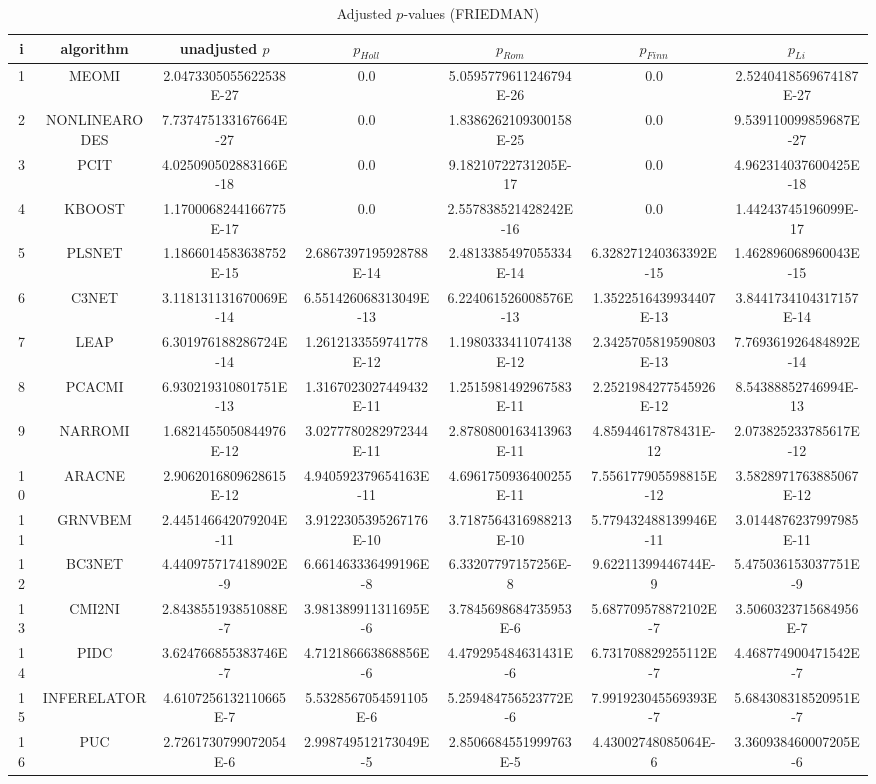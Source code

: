 \documentclass[a4paper,10pt]{article}
\begin{document}
\begin{landscape}
\begin{table}[!htp]
\centering\scriptsize
\caption{Adjusted $p$-values (FRIEDMAN)}
\begin{tabular}{ccccccc}
i&algorithm&unadjusted $p$&$p_{Holl}$&$p_{Rom}$&$p_{Finn}$&$p_{Li}$\\
\hline
1&MEOMI&2.0473305055622538E-27&0.0&5.0595779611246794E-26&0.0&2.5240418569674187E-27\\
2&NONLINEARODES&7.737475133167664E-27&0.0&1.8386262109300158E-25&0.0&9.539110099859687E-27\\
3&PCIT&4.025090502883166E-18&0.0&9.18210722731205E-17&0.0&4.962314037600425E-18\\
4&KBOOST&1.1700068244166775E-17&0.0&2.557838521428242E-16&0.0&1.44243745196099E-17\\
5&PLSNET&1.1866014583638752E-15&2.6867397195928788E-14&2.4813385497055334E-14&6.328271240363392E-15&1.462896068960043E-15\\
6&C3NET&3.118131131670069E-14&6.551426068313049E-13&6.224061526008576E-13&1.3522516439934407E-13&3.8441734104317157E-14\\
7&LEAP&6.301976188286724E-14&1.2612133559741778E-12&1.1980333411074138E-12&2.3425705819590803E-13&7.769361926484892E-14\\
8&PCACMI&6.930219310801751E-13&1.3167023027449432E-11&1.2515981492967583E-11&2.2521984277545926E-12&8.54388852746994E-13\\
9&NARROMI&1.6821455050844976E-12&3.0277780282972344E-11&2.8780800163413963E-11&4.85944617878431E-12&2.073825233785617E-12\\
10&ARACNE&2.9062016809628615E-12&4.940592379654163E-11&4.6961750936400255E-11&7.556177905598815E-12&3.5828971763885067E-12\\
11&GRNVBEM&2.445146642079204E-11&3.9122305395267176E-10&3.7187564316988213E-10&5.779432488139946E-11&3.0144876237997985E-11\\
12&BC3NET&4.440975717418902E-9&6.661463336499196E-8&6.33207797157256E-8&9.62211399446744E-9&5.475036153037751E-9\\
13&CMI2NI&2.843855193851088E-7&3.981389911311695E-6&3.7845698684735953E-6&5.687709578872102E-7&3.5060323715684956E-7\\
14&PIDC&3.624766855383746E-7&4.712186663868856E-6&4.479295484631431E-6&6.731708829255112E-7&4.468774900471542E-7\\
15&INFERELATOR&4.6107256132110665E-7&5.5328567054591105E-6&5.259484756523772E-6&7.991923045569393E-7&5.684308318520951E-7\\
16&PUC&2.7261730799072054E-6&2.998749512173049E-5&2.8506684551999763E-5&4.43002748085064E-6&3.360938460007205E-6\\

\end{tabular}
\end{table}
\end{landscape}
\end{document}
